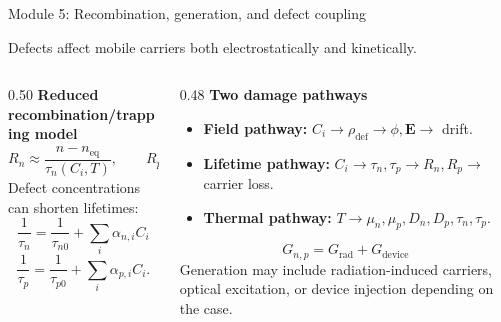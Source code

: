 \documentclass[aspectratio=169,9pt]{beamer}
\newcommand{\E}{\bm{E}}
\begin{document}
\begin{frame}{Module 5: Recombination, generation, and defect coupling}
\footnotesize
\vspace{-3mm}
\begin{bluebox}
\centering
Defects affect mobile carriers both electrostatically and kinetically.
\end{bluebox}

\vspace{1mm}
\begin{columns}[T,totalwidth=\textwidth]
\begin{column}{0.50\textwidth}
\textbf{Reduced recombination/trapping model}
\begin{equation*}
\boxed{R_n\approx \frac{n-n_{\mathrm{eq}}}{\tau_n(C_i,T)}},\qquad
\boxed{R_p\approx \frac{p-p_{\mathrm{eq}}}{\tau_p(C_i,T)}}
\end{equation*}
\small
Defect concentrations can shorten lifetimes:
\begin{equation*}
\boxed{\frac{1}{\tau_n}=\frac{1}{\tau_{n0}}+\sum_i \alpha_{n,i}C_i}
\end{equation*}
\begin{equation*}
\boxed{\frac{1}{\tau_p}=\frac{1}{\tau_{p0}}+\sum_i \alpha_{p,i}C_i.}
\end{equation*}
\end{column}
\begin{column}{0.48\textwidth}
\textbf{Two damage pathways}
\begin{itemize}\setlength\itemsep{0.55mm}
\item \textbf{Field pathway:} \(C_i\rightarrow\rho_{\mathrm{def}}\rightarrow \phi,\E\rightarrow\) drift.
\item \textbf{Lifetime pathway:} \(C_i\rightarrow\tau_n,\tau_p\rightarrow R_n,R_p\rightarrow\) carrier loss.
\item \textbf{Thermal pathway:} \(T\rightarrow\mu_n,\mu_p,D_n,D_p,\tau_n,\tau_p\).
\end{itemize}
\begin{equation*}
\boxed{G_{n,p}=G_{\mathrm{rad}}+G_{\mathrm{device}}}
\end{equation*}
\small
Generation may include radiation-induced carriers, optical excitation, or device injection depending on the case.
\end{column}
\end{columns}
\end{frame}
\end{document}
